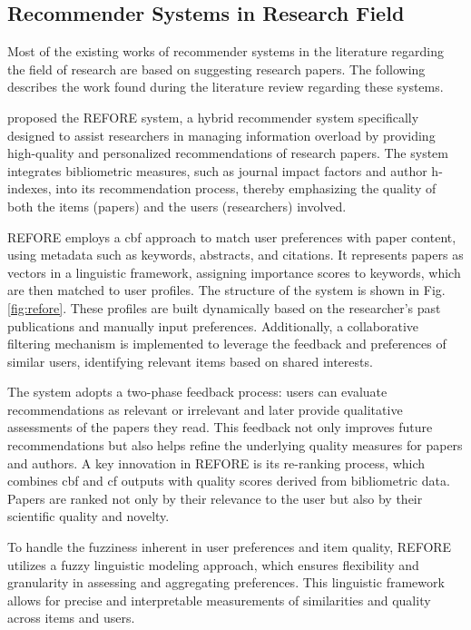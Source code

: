 \subsection*{Recommender Systems in Research Field}\label{sec:recommender-systems-in-research-field}
Most of the existing works of recommender systems in the literature regarding the field of research are based on suggesting research papers.
The following describes the work found during the literature review regarding these systems.

\cite{refore} proposed the REFORE system, a hybrid recommender system specifically designed to assist researchers in managing information overload by providing high-quality and personalized recommendations of research papers.
The system integrates bibliometric measures, such as journal impact factors and author h-indexes, into its recommendation process, thereby emphasizing the quality of both the items (papers) and the users (researchers) involved.

REFORE employs a \gls{cbf} approach to match user preferences with paper content, using metadata such as keywords, abstracts, and citations.
It represents papers as vectors in a linguistic framework, assigning importance scores to keywords, which are then matched to user profiles.
The structure of the system is shown in Fig. \ref{fig:refore}.
These profiles are built dynamically based on the researcher's past publications and manually input preferences.
Additionally, a collaborative filtering mechanism is implemented to leverage the feedback and preferences of similar users, identifying relevant items based on shared interests.

The system adopts a two-phase feedback process: users can evaluate recommendations as relevant or irrelevant and later provide qualitative assessments of the papers they read.
This feedback not only improves future recommendations but also helps refine the underlying quality measures for papers and authors.
A key innovation in REFORE is its re-ranking process, which combines \gls{cbf} and \gls{cf} outputs with quality scores derived from bibliometric data.
Papers are ranked not only by their relevance to the user but also by their scientific quality and novelty.

To handle the fuzziness inherent in user preferences and item quality, REFORE utilizes a fuzzy linguistic modeling approach, which ensures flexibility and granularity in assessing and aggregating preferences.
This linguistic framework allows for precise and interpretable measurements of similarities and quality across items and users.

